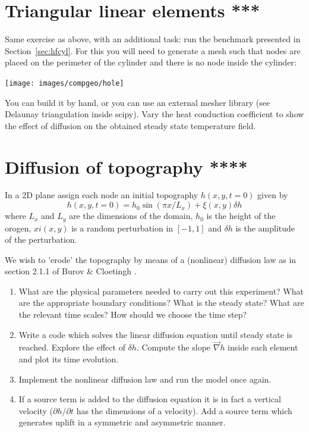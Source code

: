 \section{Triangular linear elements ***}

Same exercise as above, with an additional task: run the benchmark
presented in Section~\ref{sec:hfcyl}.
For this you will need to generate a mesh 
such that nodes are placed on the perimeter of the cylinder and there is 
no node inside the cylinder:

\texttt{[image: images/compgeo/hole]}

You can build it 
by hand, or you can use an external mesher library (see Delaunay triangulation inside scipy).
Vary the heat conduction coefficient to show the effect of diffusion on the obtained
steady state temperature field.  



\section{Diffusion of topography ****}

In a 2D plane assign each node an initial topography $h(x,y,t=0)$ given by 
\[
h(x,y,t=0)= h_0 \sin(\pi x/L_x) + \xi(x,y) \delta h
\]
where $L_x$ and $L_y$ are the dimensions of the domain, $h_0$ is the 
height of the orogen, $xi(x,y)$ is a random perturbation in $[-1,1]$
and $\delta h$ is the amplitude of the perturbation.

We wish to 'erode' the topography by means of a (nonlinear) diffusion law
as in section 2.1.1 of Burov \& Cloetingh \cite{bucl97}.

\begin{enumerate}
\item What are the physical parameters needed to carry out this experiment? 
What are the appropriate boundary conditions? 
What is the steady state? What are the relevant time scales? How should we choose the time step?
\item Write a code which solves the linear diffusion equation until steady state is reached.
Explore the effect of $\delta h$. Compute the slope $\vec\nabla h$ inside each element and plot 
its time evolution. 
\item Implement the nonlinear diffusion law and run the model once again. 
\item If a source term is added to the diffusion equation it is in fact a vertical velocity
($\partial h/\partial t$ has the dimensions of a velocity). Add a source term which generates 
uplift in a symmetric and asymmetric manner.  
\end{enumerate}

